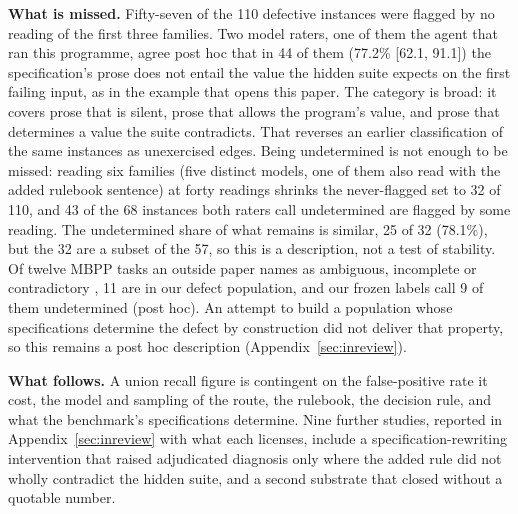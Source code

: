 \textbf{What is missed.} Fifty-seven of the 110 defective instances were flagged by no reading of
the first three families. Two model raters, one of them the agent that ran this programme, agree
post hoc that in 44 of them (77.2\% [62.1, 91.1]) the specification's prose does not entail the value the hidden suite expects on the first failing input, as in the example that opens this paper. The category is broad: it covers prose that is silent, prose that allows the program's value, and prose that determines a value the suite contradicts. That reverses an earlier
classification of the same instances as unexercised edges. Being undetermined is not enough to be
missed: reading six families (five distinct models, one of them also read with the added rulebook sentence) at forty readings shrinks the never-flagged set to 32 of 110, and 43
of the 68 instances both raters call undetermined are flagged by some reading. The undetermined
share of what remains is similar, 25 of 32 (78.1\%), but the 32 are a subset of the 57, so this is a
description, not a test of stability. Of twelve MBPP tasks an outside paper names as ambiguous,
incomplete or contradictory \citep{richter2026collapse}, 11 are in our defect population, and our
frozen labels call 9 of them undetermined (post hoc). An attempt to build a population whose
specifications determine the defect by construction did not deliver that property, so this
remains a post hoc description (Appendix~\ref{sec:inreview}).

\textbf{What follows.} A union recall figure is contingent on the false-positive rate it cost, the
model and sampling of the route, the rulebook, the decision rule, and what the benchmark's
specifications determine. Nine further studies, reported in Appendix~\ref{sec:inreview} with what
each licenses, include a specification-rewriting intervention that raised adjudicated diagnosis only
where the added rule did not wholly contradict the hidden suite, and a second substrate that closed without a
quotable number.
